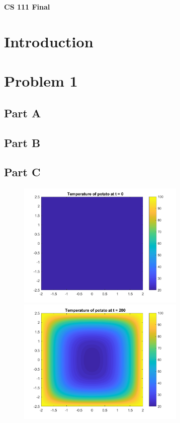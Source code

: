 \documentclass[12pt]{article}
\begin{document}
\centerline{\Large\textbf{CS 111 Final}}
\vspace{.5cm}

\section*{Introduction}\label{sec::Intro}
\section*{Problem 1}\label{sec::Problem1}
\subsection*{Part A}
\subsection*{Part B}
\subsection*{Part C}

\begin{figure}[htb]%
    \centering
    {\includegraphics[width=8cm]{Problem1_fig1.png}}%
    \qquad
    {\includegraphics[width=8cm]{Problem1_fig2.png}}%
    \label{fig:fig1 and fig2}%
\end{figure}
\end{document}
